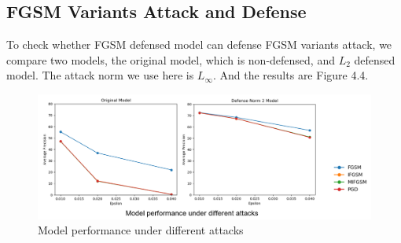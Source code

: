 \subsection{FGSM Variants Attack and Defense}
To check whether FGSM defensed model can defense FGSM variants attack, we compare two 
models, the original model, which is non-defensed, and \(L_{2}\) defensed model. The attack 
norm we use here is \(L_{\infty}\). And the results are Figure 4.4.
\begin{figure}[!htbp]
\centering
\includegraphics[scale=0.5]{Graphics/FGSM Variants.png}
\caption{Model performance under different attacks}
\label{fig:FGSM Variants}
\end{figure}
